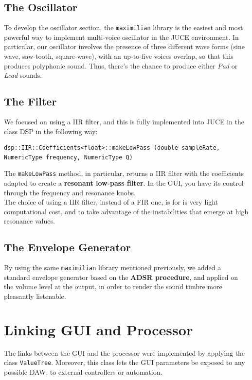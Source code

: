 \documentclass[11pt]{article}
\begin{document}
\subsection{The Oscillator}
To develop the oscillator section, the \texttt{maximilian} library is the easiest and most powerful way to implement multi-voice oscillator in the JUCE environment. In particular, our oscillator involves the presence of three different wave forms (sine wave, saw-tooth, square-wave), with an up-to-five voices overlap, so that this produces polyphonic sound. Thus, there's the chance to produce  either \textit{Pad} or \textit{Lead} sounds.

\subsection{The Filter}
We focused on using a IIR filter, and this is fully implemented into JUCE in the class DSP in the following way:

\begin{lstlisting}
dsp::IIR::Coefficients<float>::makeLowPass (double sampleRate, NumericType frequency, NumericType Q)
\end{lstlisting}

The \texttt{makeLowPass} method, in particular, returns a IIR filter with the coefficients adapted to create a \textbf{resonant low-pass filter}. In the GUI, you have its control through the frequency and resonance knobs.\\
The choice of using a IIR filter, instead of a FIR one, is for is very light computational cost, and to take advantage of the instabilities that emerge at high resonance values.

\subsection{The Envelope Generator}
By using the same \texttt{maximilian} library mentioned previously, we added a standard envelope generator based on the \textbf{ADSR procedure}, and applied on the volume level at the output, in order to render the sound timbre more pleasantly listenable.

\section{Linking GUI and Processor}
The links between the GUI and the processor were implemented by applying the class \texttt{ValueTree}. Moreover, this class lets the GUI parameters be exposed to any possible DAW, to external controllers or automation.
\end{document}
